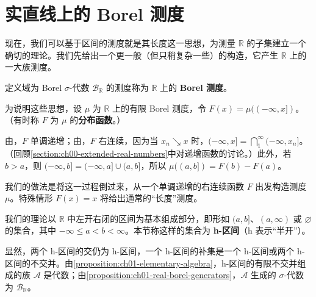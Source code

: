 \documentclass[../../main.tex]{subfiles}%
\begin{document}
\section{实直线上的 Borel 测度}\label{section:ch01-borel-measures-real-line}

现在，我们可以基于区间的测度就是其长度这一思想，为测量 $\mathbb{R}$ 的子集建立一个确切的理论。我们先给出一个更一般（但只稍复杂一些）的构造，它产生 $\mathbb{R}$ 上的一大族测度。
\begin{definition}[Borel 测度]\label{definition:ch01-borel-measure}
定义域为 Borel $\sigma$-代数 $\mathscr{B}_{\mathbb{R}}$ 的测度称为 $\mathbb{R}$ 上的 \textbf{Borel 测度}。
\end{definition}


\begin{definition}[分布函数]\label{definition:ch01-distribution-function-motivation}
为说明这些思想，设 $\mu$ 为 $\mathbb{R}$ 上的有限 Borel 测度，令 $F(x)=\mu((-\infty,x])$。（有时称 $F$ 为 $\mu$ 的\textbf{分布函数}。）
\end{definition}

\begin{remark}
由，$F$ 单调递增；由，$F$ 右连续，因为当 $x_n\searrow x$ 时，$(-\infty,x]=\bigcap_1^\infty(-\infty,x_n]$。（回顾\cref{section:ch00-extended-real-numbers}中对递增函数的讨论。）此外，若 $b>a$，则 $(-\infty,b]=(-\infty,a]\cup(a,b]$，所以 $\mu((a,b])=F(b)-F(a)$。
\end{remark}
我们的做法是将这一过程倒过来，从一个单调递增的右连续函数 $F$ 出发构造测度 $\mu$。特殊情形 $F(x)=x$ 将给出通常的“长度”测度。


\begin{definition}[h-区间]\label{definition:ch01-h-intervals}
我们的理论以 $\mathbb{R}$ 中左开右闭的区间为基本组成部分，即形如 $(a,b]$、$(a,\infty)$ 或 $\varnothing$ 的集合，其中 $-\infty\leqslant a<b<\infty$。本节称这样的集合为 \textbf{h-区间}（h 表示“半开”）。
\end{definition}

\begin{remark}
显然，两个 h-区间的交仍为 h-区间，一个 h-区间的补集是一个 h-区间或两个 h-区间的不交并。由\cref{proposition:ch01-elementary-algebra}，h-区间的有限不交并组成的族 $\mathscr{A}$ 是代数；由\cref{proposition:ch01-real-borel-generators}，$\mathscr{A}$ 生成的 $\sigma$-代数为 $\mathscr{B}_{\mathbb{R}}$。
\end{remark}
\end{document}
